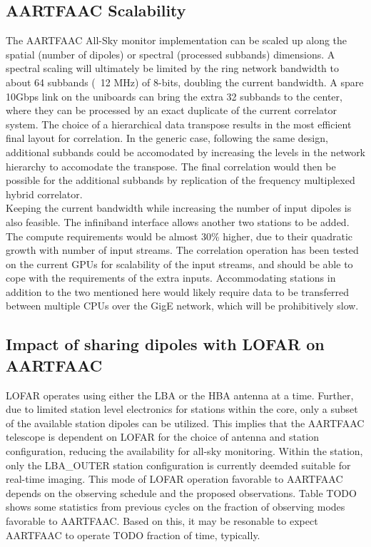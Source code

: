 \documentclass{ws-jai}
\begin{document}
\subsection {AARTFAAC Scalability}
The AARTFAAC All-Sky  monitor implementation can be scaled up  along the spatial
(number  of dipoles)  or spectral  (processed subbands)  dimensions. A  spectral
scaling will  ultimately be limited  by the ring  network bandwidth to  about 64
subbands (~12  MHz) of 8-bits,  doubling the  current bandwidth. A  spare 10Gbps
link on the uniboards can bring the  extra 32 subbands to the center, where they
can be  processed by an  exact duplicate of  the current correlator  system. The
choice of  a hierarchical  data transpose  results in  the most  efficient final
layout  for  correlation.  In  the  generic case,  following  the  same  design,
additional subbands could be accomodated by increasing the levels in the network
hierarchy  to accomodate  the transpose.  The  final correlation  would then  be
possible for the additional subbands by replication of the frequency multiplexed
hybrid correlator.\\

Keeping the  current bandwidth while increasing  the number of input  dipoles is
also  feasible. The  infiniband  interface  allows another  two  stations to  be
added.  The compute  requirements  would be  almost 30\%  higher,  due to  their
quadratic growth  with number of  input streams.  The correlation  operation has
been tested on the current GPUs for scalability of the input streams, and should
be  able to  cope  with  the requirements  of  the  extra inputs.  Accommodating
stations in addition to  the two mentioned here would likely  require data to be
transferred  between  multiple  CPUs  over  the  GigE  network,  which  will  be
prohibitively slow.

\subsection {\label{subsec:impact_lofar} Impact of sharing dipoles with LOFAR on AARTFAAC}
LOFAR operates using either  the LBA or the HBA antenna at  a time. Further, due
to limited station level electronics for stations within the core, only a subset
of the available station dipoles can be utilized. This implies that the AARTFAAC
telescope  is  dependent  on  LOFAR  for  the  choice  of  antenna  and  station
configuration,  reducing the  availability  for all-sky  monitoring. Within  the
station, only the LBA\_OUTER station configuration is currently deemded suitable
for  real-time imaging.   This mode  of  LOFAR operation  favorable to  AARTFAAC
depends on  the observing  schedule and the  proposed observations.   Table TODO
shows some  statistics from previous cycles  on the fraction of  observing modes
favorable to AARTFAAC. Based on this, it  may be resonable to expect AARTFAAC to
operate TODO fraction of time, typically.
\end{document}
